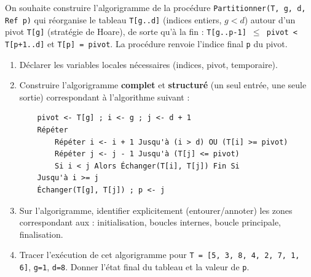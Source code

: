 \documentclass[11pt]{article}
\begin{document}
\begin{exercice}
On souhaite construire l'algorigramme de la procédure \texttt{Partitionner(T, g, d, Ref p)} qui réorganise le tableau \texttt{T[g..d]} (indices entiers, $g < d$) autour d'un pivot \texttt{T[g]} (stratégie de Hoare), de sorte qu'à la fin : \texttt{T[g..p-1] $\le$ pivot < T[p+1..d]} et \texttt{T[p] = pivot}. La procédure renvoie l'indice final \texttt{p} du pivot.

\begin{enumerate}
    \item Déclarer les variables locales nécessaires (indices, pivot, temporaire).
    \item Construire l'algorigramme \textbf{complet} et \textbf{structuré} (un seul entrée, une seule sortie) correspondant à l'algorithme suivant :
    \begin{verbatim}
    pivot <- T[g] ; i <- g ; j <- d + 1
    Répéter
        Répéter i <- i + 1 Jusqu'à (i > d) OU (T[i] >= pivot)
        Répéter j <- j - 1 Jusqu'à (T[j] <= pivot)
        Si i < j Alors Échanger(T[i], T[j]) Fin Si
    Jusqu'à i >= j
    Échanger(T[g], T[j]) ; p <- j
    \end{verbatim}
    \item Sur l'algorigramme, identifier explicitement (entourer/annoter) les zones correspondant aux : initialisation, boucles internes, boucle principale, finalisation.
    \item Tracer l'exécution de cet algorigramme pour \texttt{T = [5, 3, 8, 4, 2, 7, 1, 6]}, \texttt{g=1}, \texttt{d=8}. Donner l'état final du tableau et la valeur de \texttt{p}.
\end{enumerate}
\end{exercice}
\end{document}
